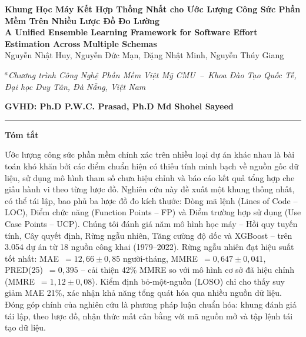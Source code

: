 \documentclass[12pt,a4paper]{article}
\begin{document}
\begin{center}
{\large\bfseries Khung Học Máy Kết Hợp Thống Nhất cho Ước Lượng Công Sức Phần Mềm Trên Nhiều Lược Đồ Đo Lường}\\[4pt]
{\normalsize\bfseries A Unified Ensemble Learning Framework for Software Effort Estimation Across Multiple Schemas}\\[10pt]

{\normalsize
Nguyễn Nhật Huy, Nguyễn Đức Mạn, Đặng Nhật Minh, Nguyễn Thúy Giang\\[4pt]
}

{\small\itshape
$^{a}$Chương trình Công Nghệ Phần Mềm Việt Mỹ CMU~--~Khoa Đào Tạo Quốc Tế,\\
Đại học Duy Tân, Đà Nẵng, Việt Nam\\[4pt]
}

{\normalsize\bfseries GVHD: Ph.D P.W.C. Prasad, Ph.D Md Shohel Sayeed}
\end{center}

\vspace{8pt}
\hrule
\vspace{6pt}

\noindent\textbf{Tóm tắt}

\vspace{4pt}
\noindent
Ước lượng công sức phần mềm chính xác trên nhiều loại dự án khác nhau là bài toán khó khăn bởi các điểm chuẩn hiện có thiếu tính minh bạch về nguồn gốc dữ liệu, sử dụng mô hình tham số chưa hiệu chỉnh và báo cáo kết quả tổng hợp che giấu hành vi theo từng lược đồ. Nghiên cứu này đề xuất một khung thống nhất, có thể tái lập, bao phủ ba lược đồ đo kích thước: Dòng mã lệnh (Lines of Code -- LOC), Điểm chức năng (Function Points -- FP) và Điểm trường hợp sử dụng (Use Case Points -- UCP). Chúng tôi đánh giá năm mô hình học máy -- Hồi quy tuyến tính, Cây quyết định, Rừng ngẫu nhiên, Tăng cường độ dốc và XGBoost -- trên 3.054 dự án từ 18 nguồn công khai (1979--2022). Rừng ngẫu nhiên đạt hiệu suất tốt nhất: MAE~$= 12{,}66 \pm 0{,}85$ người-tháng, MMRE~$= 0{,}647 \pm 0{,}041$, PRED(25)~$= 0{,}395$ -- cải thiện 42\% MMRE so với mô hình cơ sở đã hiệu chỉnh (MMRE~$= 1{,}12 \pm 0{,}08$). Kiểm định bỏ-một-nguồn (LOSO) chỉ cho thấy suy giảm MAE 21\%, xác nhận khả năng tổng quát hóa qua nhiều nguồn dữ liệu. Đóng góp chính của nghiên cứu là phương pháp luận chuẩn hóa: khung đánh giá tái lập, theo lược đồ, nhận thức mất cân bằng với mã nguồn mở và tập lệnh tái tạo dữ liệu.
\end{document}
